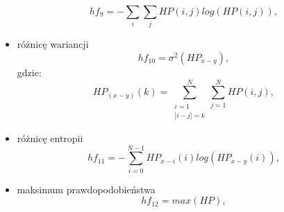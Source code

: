 \begin{itemize}
\begin{equation}
		hf_9 =  - \sum_i \sum_j HP(i,j) log(HP(i,j)),
	\end{equation} 
	\item różnicę wariancji
	\begin{equation}
	 	hf_{10} = \sigma^2(HP_{x-y}),
	\end{equation} 
	gdzie:
	\begin{equation}
		HP_(x-y)(k) = \sum_{\substack{i=1 \\ |i-j| = k}}^{N} \sum_{j=1}^{N} HP(i,j),
	\end{equation} 	
	\item różnicę entropii
	\begin{equation}
	 hf_{11} = - \sum_{i=0}^{N-1} HP_{x-i}(i)log(HP_{x-y}(i)),
	\end{equation}
	\item maksimum prawdopodobieństwa
	\begin{equation}
	hf_12 = max(HP),
	\end{equation}
\end{itemize}
